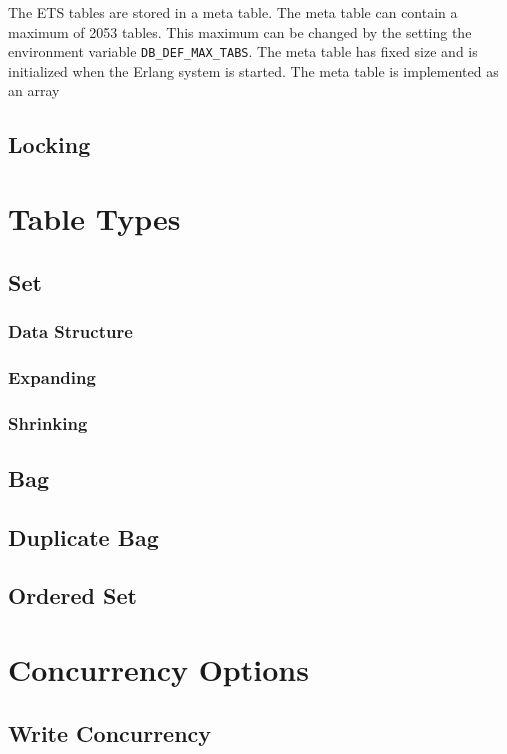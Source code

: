 \documentclass[aps,pre,preprint,nofootinbib]{revtex4}
\begin{document}
The ETS tables are stored in a meta table.
The meta table can contain a maximum of 2053 tables.
This maximum can be changed by the setting the  environment variable \verb|DB_DEF_MAX_TABS|.
The meta table has fixed size and is initialized when the Erlang system is started.
The meta table is implemented as an array 


\subsection{Locking} \label{sec:tables_locking}


\section{Table Types} \label{sec:table_types}

\subsection{Set}     %
\subsubsection{Data Structure}
\subsubsection{Expanding}
\subsubsection{Shrinking}

\subsection{Bag}
\subsection{Duplicate Bag}
\subsection{Ordered Set}


\section{Concurrency Options} \label{sec:concurrency_options}

\subsection{Write Concurrency}
\end{document}
